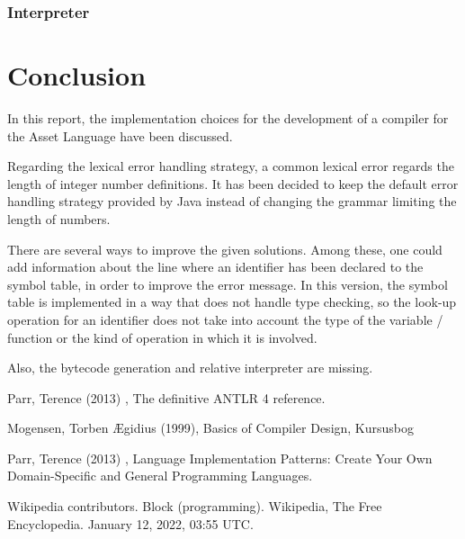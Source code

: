 \documentclass[11pt]{article} %
\begin{document}
\subsubsection{Interpreter}

\section{Conclusion}
In this report, the implementation choices for the development of a compiler for the Asset Language have been discussed.

\medskip

Regarding the lexical error handling strategy, a common lexical error regards the length of integer number definitions. It has been decided to keep the default error handling strategy provided by Java instead of changing the grammar limiting the length of numbers.

\medskip

There are several ways to improve the given solutions. Among these, one could add information about the line where an identifier has been declared to the symbol table, in order to improve the error message. In this version, the symbol table is implemented in a way that does not handle type checking, so the look-up operation for an identifier does not take into account the type of the variable / function or the kind of operation in which it is involved.

\medskip

Also, the bytecode generation and relative interpreter are missing.

\clearpage

\begin{thebibliography}{9}
Parr, Terence (2013) , The definitive ANTLR 4 reference.

Mogensen, {Torben {\AE}gidius} (1999), Basics of Compiler Design, Kursusbog 

Parr, Terence (2013) , Language Implementation Patterns: Create Your Own Domain-Specific and General Programming Languages.

Wikipedia contributors. Block (programming). Wikipedia, The Free Encyclopedia. January 12, 2022, 03:55 UTC. 
\end{thebibliography}
\end{document}

